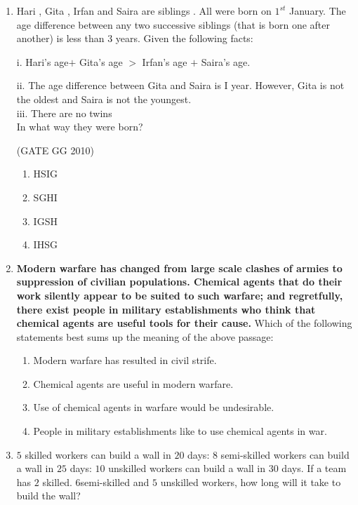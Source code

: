\documentclass[journal]{IEEEtran}
\begin{document}
\begin{enumerate}[start=26]
\item  Hari , Gita , Irfan  and Saira  are siblings . All were born on $1^{st}$ January. The age difference between any two successive siblings (that is born one after another) is less than $3$ years. Given the following facts:

i. Hari's age$+$ Gita's age $>$ Irfan's age $+$ Saira's age.

ii. The age difference between Gita and Saira is I year. However, Gita is not the oldest and Saira is not the youngest.\\
iii. There are no twins\\
In what way they were born?

\hfill (GATE GG 2010) 
\begin{multicols}{4}

\begin{enumerate}
    \item  HSIG
\item  SGHI
\item  IGSH
\item  IHSG

\end{enumerate}
\end{multicols}

\item \textbf{Modern warfare has changed from large scale clashes of armies to suppression of civilian populations. Chemical agents that do their work silently appear to be suited to such warfare; and regretfully, there exist people in military establishments who think that chemical agents are useful tools for their cause.}
Which of the following statements best sums up the meaning of the above passage:




\begin{enumerate}
    \item  Modern warfare has resulted in civil strife.

\item  Chemical agents are useful in modern warfare.
\item  Use of chemical agents in warfare would be undesirable.
\item  People in military establishments like to use chemical agents in war.
\end{enumerate}


\item  $5$ skilled workers can build a wall in $20$ days: $8$ semi-skilled workers can build a wall in $25$ days: $10$ unskilled workers can build a wall in $30$ days. If a team has $2$ skilled. $6$semi-skilled and $5$ unskilled workers, how long will it take to build the wall? 


\end{enumerate}
\end{document}
